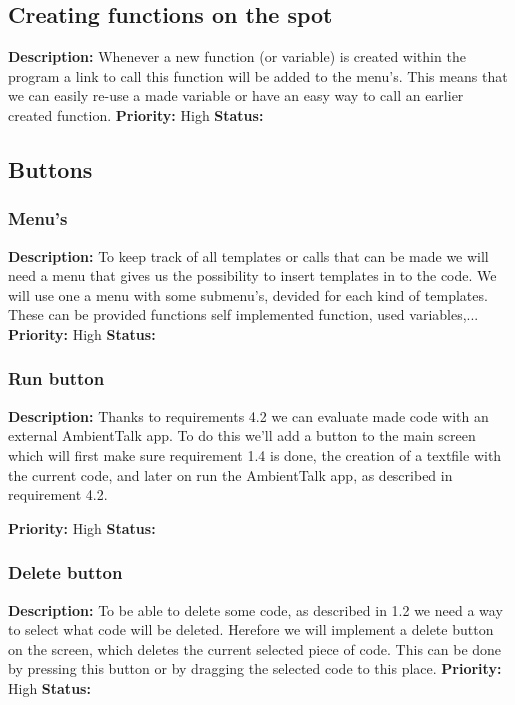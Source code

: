 \documentclass{article}
\begin{document}
\subsection{Creating functions on the spot}
\textbf{Description: } Whenever a new function (or variable) is created within the program a link to call this function will be added to the menu's. This means that we can
easily re-use a made variable or have an easy way to call an earlier created function. \newline
\textbf{Priority:} High \newline
\textbf{Status: } \newline
\subsection{Buttons}
\subsubsection{Menu's}
\textbf{Description: } To keep track of all templates or calls that can be made we will need a menu that gives us the possibility to insert templates in to the code.
We will use one a menu with some submenu's, devided for each kind of templates. These can be provided functions self implemented function, used variables,... \newline
\textbf{Priority:} High \newline
\textbf{Status: } \newline
\subsubsection{Run button}
\textbf{Description: } Thanks to requirements 4.2 we can evaluate made code with an external AmbientTalk app. To do this we'll add a button
to the main screen which will first make sure requirement 1.4 is done, the creation of a textfile with the current code, and later on run the AmbientTalk app, as described in requirement 4.2.

\textbf{Priority:} High \newline
\textbf{Status: } \newline
\subsubsection{Delete button}
\textbf{Description: } To be able to delete some code, as described in 1.2 we need a way to select what code will be deleted. Herefore we will
implement a delete button on the screen, which deletes the current selected piece of code. This can be done by pressing this button or by dragging the selected code to this place. 
\textbf{Priority:} High \newline
\textbf{Status: } \newline
\end{document}
